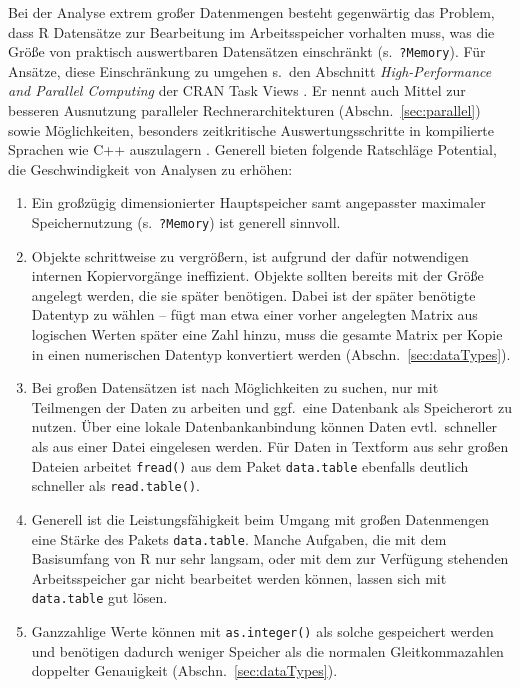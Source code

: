 Bei der Analyse extrem großer Datenmengen besteht gegenwärtig das Problem, dass R Datensätze zur Bearbeitung im Arbeitsspeicher vorhalten muss, was die Größe von praktisch auswertbaren Datensätzen einschränkt (s.\ \lstinline!?Memory!). Für Ansätze, diese Einschränkung zu umgehen s.\ den Abschnitt \emph{High-Performance and Parallel Computing} der CRAN Task Views \cite{CRANtvHPC}. Er nennt auch Mittel zur besseren Ausnutzung paralleler Rechnerarchitekturen (Abschn.\ \ref{sec:parallel}) sowie Möglichkeiten, besonders zeitkritische Auswertungsschritte in kompilierte Sprachen wie C++ auszulagern \cite{Eddelbuettel2013}. Generell bieten folgende Ratschläge Potential, die Geschwindigkeit von Analysen zu erhöhen:
\begin{enumerate}
\item Ein großzügig dimensionierter Hauptspeicher samt angepasster maximaler Speichernutzung (s.\ \lstinline!?Memory!) ist generell sinnvoll.
\item Objekte schrittweise zu vergrößern, ist aufgrund der dafür notwendigen internen Kopiervorgänge ineffizient. Objekte sollten bereits mit der Größe angelegt werden, die sie später benötigen. Dabei ist der später benötigte Datentyp zu wählen -- fügt man etwa einer vorher angelegten Matrix aus logischen Werten später eine Zahl hinzu, muss die gesamte Matrix per Kopie in einen numerischen Datentyp konvertiert werden (Abschn.\ \ref{sec:dataTypes}).
\item Bei großen Datensätzen ist nach Möglichkeiten zu suchen, nur mit Teilmengen der Daten zu arbeiten und ggf.\ eine Datenbank als Speicherort zu nutzen. Über eine lokale Datenbankanbindung können Daten evtl.\ schneller als aus einer Datei eingelesen werden. Für Daten in Textform aus sehr großen Dateien arbeitet \lstinline!fread()! aus dem Paket \lstinline!data.table! ebenfalls deutlich schneller als \lstinline!read.table()!.
\item Generell ist die Leistungsfähigkeit beim Umgang mit großen Datenmengen eine Stärke des Pakets \lstinline!data.table!. Manche Aufgaben, die mit dem Basisumfang von R nur sehr langsam, oder mit dem zur Verfügung stehenden Arbeitsspeicher gar nicht bearbeitet werden können, lassen sich mit \lstinline!data.table! gut lösen.
\item Ganzzahlige Werte können mit \lstinline!as.integer()! als solche gespeichert werden und benötigen dadurch weniger Speicher als die normalen Gleitkommazahlen doppelter Genauigkeit (Abschn.\ \ref{sec:dataTypes}).

\end{enumerate}
